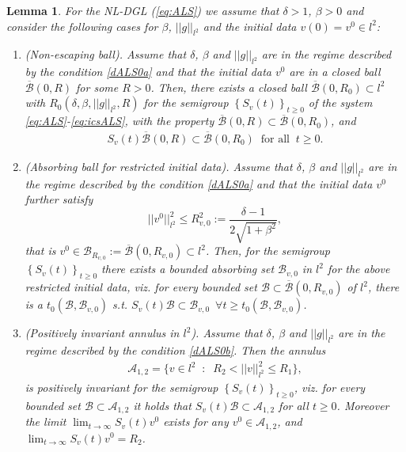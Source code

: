 \documentclass[preprintnumbers,amsmath,amssymb]{revtex4}
\newtheorem{lemma}{Lemma}[section]
\begin{document}
\begin{lemma}
\label{Lemma:absorbingmu}	
For the NL-DGL (\ref{eq:ALS}) we assume that $\delta>1$, $\beta>0$ and consider the following cases for $\beta$, $||g||_{l^2}$ and the initial data $v(0)=v^0\in l^2$:
	\begin{enumerate}	
		\item (Non-escaping ball).
		Assume that $\delta$, $\beta$ and $||g||_{l^2}$  are in the regime described by the condition \eqref{dALS0a} and that the initial data $v^0$ are in a closed ball $\overline{\mathcal{B}}(0,R)$ for some $R>0$.  
Then, there exists a closed ball $\overline{\mathcal{B}}(0,R_0)\subset l^2$ with $R_0(\delta, \beta, ||g||_{l^2}, R)$  for the semigroup $\left\{S_v(t)\right\}_{t\ge 0}$ of the system \eqref{eq:ALS}-\eqref{eq:icsALS},  with the property $\overline{\mathcal{B}}(0,R)\subset \overline{\mathcal{B}}(0,R_0)$, and
\begin{eqnarray}
\label{tas}
S_v(t) \overline{\mathcal{B}}(0,R)\subset \overline{\mathcal{B}}(0,R_0)\;\;\mbox{for all}\;\;t\geq 0.
\end{eqnarray}
\item (Absorbing ball for restricted initial data).	Assume that $\delta$, $\beta$ and $||g||_{l^2}$  are in the regime described by the condition \eqref{dALS0a} and that the initial data $v^0$ further satisfy
\begin{equation}
\label{rescond}
|| v^0||_{l^2}^2\le R_{v,0}^2:=\frac{\delta-1}{2\sqrt{1+\beta^2}},
\end{equation}
that is $v^0\in \mathcal{B}_{R_{v,0}}:=\overline{\mathcal{B}}(0,{R_{v,0}})\subset l^2$. 
Then, for the semigroup $\left\{S_v(t)\right\}_{t\ge 0}$
there exists a bounded absorbing set $\mathcal{B}_{v,0}$ in $l^2$ for the above restricted initial data, viz. for every bounded set $\mathcal{B}\subset \overline{\mathcal{B}}(0,{R_{v,0}})$ of $l^2$, there is a $t_0(\mathcal{B},\mathcal{B}_{v,0})$ s.t.  
$S_v(t)\mathcal{B}\subset\mathcal{B}_{v,0}\,\,\,\forall t\ge t_0(\mathcal{B},\mathcal{B}_{v,0})$.
\item (Positively invariant annulus in $l^2$).  Assume that $\delta$, $\beta$ and $||g||_{l^2}$ are in the regime described by the condition \eqref{dALS0b}. Then the annulus
\begin{eqnarray}
\label{inan}
\mathcal{A}_{1,2}=\bigg\{v\in l^2\;\;:\;\;R_2<||v||_{l^2}^2\leq R_1\bigg\},
\end{eqnarray}
is positively invariant for the semigroup $\left\{S_v(t)\right\}_{t\ge 0}$, viz.  for every bounded set $\mathcal{B}\subset \mathcal{A}_{1,2}$ it holds that $S_v(t)\mathcal{B}\subset \mathcal{A}_{1,2}$ for all $t\geq 0$. Moreover the limit  $\lim_{t\rightarrow\infty} S_v(t)v^0$ exists for any $v^0\in \mathcal{A}_{1,2}$, and   $\lim_{t\rightarrow\infty} S_v(t)v^0=R_2$.
\end{enumerate}
\end{lemma}
\end{document}
